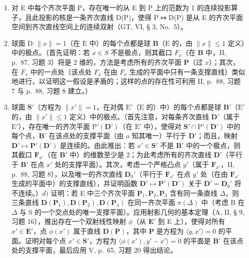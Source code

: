 \begin{enumerate}
\def\labelenumi{\alph{enumi})}
\item
  对 E 中每个齐次平面 P，存在唯一的从 E 到 P 上的范数为 1 的连续投影算子，且此投影的核是一条齐次直线 D(P)，使得 P ↦ D(P) 是从 E 的齐次平面空间到齐次直线空间上的连续双射（GT, VI, § 3, No.~5）。
\item
  球面 \(\mathrm{D}:\| x\| = 1\)（在 \(\mathrm{E}\) 中）的每个点都是球 \(\mathbf{B}\)（\(\mathrm{E}\) 的，由 \(\| x\| \leqslant 1\) 定义）中的极点。（首先证明：若 \(x\in S\) 不是极点，则其截口 \(F_{x}\)（在 \(\mathbf{B}\) 中，II, p.~87, 习题 3）将是 2 维的，方法是考虑所有的齐次平面 \(\mathbf{P}\)（过 \(x\)）；其次，在 \(F_{x}\) 中的一点处（该点处 \(F_{x}\) 在由 \(F_{x}\) 生成的平面中只有一条支撑直线）类似地进行，以证明这一假设是矛盾的；这样的点的存在性可利用 II, p.~88, 习题 7 与 p.~88, 习题 8 建立。）
\item
  球面 \(\mathbf{S}'\)（方程为 \(\| x'\| = 1\)，在对偶 \(\mathrm{E}'\)（\(\mathrm{E}\) 的）中）的每个点都是球 \(\mathbf{B}'\)（\(\mathrm{E}'\) 的，由 \(\| x'\| \leqslant 1\) 定义）中的极点。（首先注意，对每条齐次直线 \(\mathbf{D}'\)（属于 \(\mathrm{E}'\)），存在唯一的齐次平面 \(\mathrm{P}'(\mathbf{D}')\)（在 \(\mathrm{E}'\) 中），使得对 \(\mathbf{S}' \cap \mathrm{P}'(\mathbf{D}')\) 中的每个点，\(\mathbf{B}'\) 在该点处的支撑平面（由 \(a\) 知其唯一）平行于 \(\mathbf{D}'\)；而且，映射 \(\mathbf{D}' \mapsto \mathbf{P}'(\mathbf{D}')\) 是连续的。由此推出：若 \(x' \in \mathbf{S}'\) 不是 \(\mathbf{B}'\) 中的一个极点，则其截口 \(\mathbf{F}_{x'}\)（在 \(\mathbf{B}'\) 中）的维数至少是 2；为此考虑所有的齐次直线 \(\mathbf{D}'\)（平行于 \(\mathbf{B}'\) 在点 \(x'\) 处的支撑平面）。其次，考虑一个严格凸点 \(y'\)（属于 \(\mathbf{F}_{x'}\)，II, p.~88, 习题 8），以及唯一的齐次直线 \(\mathbf{D}_0'\)（平行于 \(\mathbf{F}_{x'}\) 在点 \(y'\) 处（在由 \(\mathbf{F}_{x'}\) 生成的平面中）的支撑直线），并证明函数 \(\mathbf{D}' \mapsto \mathbf{P}'(\mathbf{D}')\) 关于 \(\mathbf{D}' = \mathbf{D}_0'\) 将不连续。）\(d)\) 证明：若 E 中三个齐次平面 \(\mathbf{P}_1, \mathbf{P}_2, \mathbf{P}_3\) 含有同一条直线 \(\Delta\)，则三条直线 \(\mathbf{D}(\mathbf{P}_1), \mathbf{D}(\mathbf{P}_2), \mathbf{D}(\mathbf{P}_3)\) 在同一齐次平面 \(\pi(\Delta)\) 中（考虑 B 在 \(\Delta\) 与 S 的一个交点处的唯一支撑平面）。应用射影几何的基本定理（A, II, § 9, 习题 16），推出存在一个双射线性映射 \(\phi\)（从 \(\mathbf{E}'\) 到 E 上），使得对所有 \(x' \in \mathbf{E}'\)，点 \(\phi(x')\) 属于直线 \(\mathbf{D}(\mathbf{P})\)，其中 \(\mathbf{P}\) 是方程为 \(\langle y, x' \rangle = 0\) 的平面。证明对每个点 \(x' \in \mathbf{S}'\)，方程为 \(\langle \phi(x'), y' - x' \rangle = 0\) 的平面是 \(\mathbf{B}'\) 在该点处的支撑平面，最后应用 V, p.~65, 习题 20 得出结论。
\end{enumerate}

